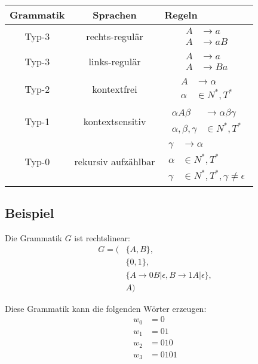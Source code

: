 \begin{center}
\begin{tabular}{c|c|p{4cm}}
    \textbf{Grammatik} & \textbf{Sprachen} & \textbf{Regeln} \\
    \hline
    Typ-3 & rechts-regulär &
    {\begin{align}
        A&\rightarrow a \\
        A&\rightarrow aB
    \end{align}} \\
    \hline
    Typ-3 & links-regulär &
    {\begin{align}
        A&\rightarrow a \\
        A&\rightarrow Ba
    \end{align}} \\
    \hline
    Typ-2 & kontextfrei &
    {\begin{align}
        A&\rightarrow \alpha \\
        \alpha&\in N^*,T^*
    \end{align}} \\
    \hline
    Typ-1 & kontextsensitiv &
    {\begin{align}
        \alpha A\beta&\rightarrow\alpha\beta\gamma \\
        \alpha,\beta,\gamma&\in N^*,T^*
    \end{align}} \\
    \hline
    Typ-0 & rekursiv aufzählbar &
    {\begin{align}
        \gamma&\rightarrow\alpha \\
        \alpha&\in N^*,T^* \\
        \gamma&\in N^*,T^*, \gamma\neq\epsilon
    \end{align}} \\
\end{tabular}
\end{center}

\subsection{Beispiel}
\begin{flushleft}
Die Grammatik $G$ ist rechtslinear:
\begin{align}
    G=(&\{A,B\},\\
    &\{0,1\},\\
    &\{A\rightarrow 0B|\epsilon,B\rightarrow 1A|\epsilon\},\\
    &A)
\end{align}

Diese Grammatik kann die folgenden Wörter erzeugen:
\begin{align}
    w_0&=0 \\
    w_1&=01 \\
    w_2&=010 \\
    w_3&=0101
\end{align}
\end{flushleft}
